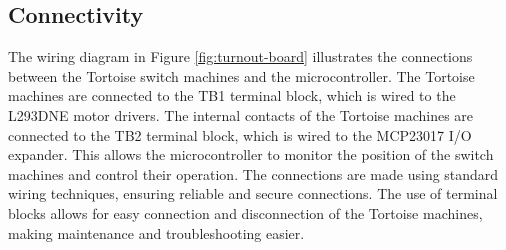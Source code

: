 \subsection{Connectivity}
The wiring diagram in Figure \ref{fig:turnout-board} illustrates the connections between the Tortoise switch machines and the microcontroller. The Tortoise machines are connected to the TB1 terminal block, which is wired to the L293DNE motor drivers.
The internal contacts of the Tortoise machines are connected to the TB2 terminal block, which is wired to the MCP23017 I/O expander. This allows the microcontroller to monitor the position of the switch machines and control their operation.
The connections are made using standard wiring techniques, ensuring reliable and secure connections. The use of terminal blocks allows for easy connection and disconnection of the Tortoise machines, making maintenance and troubleshooting easier.

